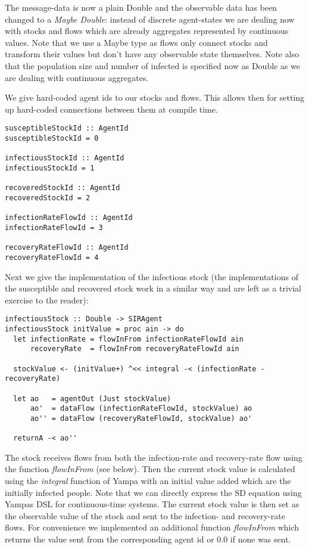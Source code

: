 The message-data is now a plain Double and the observable data has been changed to a \textit{Maybe Double}: instead of discrete agent-states we are dealing now with stocks and flows which are already aggregates represented by continuous values. Note that we use a Maybe type as flows only connect stocks and transform their values but don't have any observable state themselves. Note also that the population size and number of infected is specified now as Double as we are dealing with continuous aggregates.

We give hard-coded agent ids to our stocks and flows. This allows then for setting up hard-coded connections between them at compile time.
\begin{verbatim}
susceptibleStockId :: AgentId
susceptibleStockId = 0

infectiousStockId :: AgentId
infectiousStockId = 1

recoveredStockId :: AgentId
recoveredStockId = 2

infectionRateFlowId :: AgentId
infectionRateFlowId = 3

recoveryRateFlowId :: AgentId
recoveryRateFlowId = 4
\end{verbatim}

Next we give the implementation of the infectious stock (the implementations of the susceptible and recovered stock work in a similar way and are left as a trivial exercise to the reader):

\begin{verbatim}
infectiousStock :: Double -> SIRAgent
infectiousStock initValue = proc ain -> do
  let infectionRate = flowInFrom infectionRateFlowId ain
      recoveryRate  = flowInFrom recoveryRateFlowId ain

  stockValue <- (initValue+) ^<< integral -< (infectionRate - recoveryRate)
  
  let ao   = agentOut (Just stockValue)
      ao'  = dataFlow (infectionRateFlowId, stockValue) ao
      ao'' = dataFlow (recoveryRateFlowId, stockValue) ao'
      
  returnA -< ao''
\end{verbatim}

The stock receives flows from both the infection-rate and recovery-rate flow using the function \textit{flowInFrom} (see below). Then the current stock value is calculated using the \textit{integral} function of Yampa with an initial value added which are the initially infected people. Note that we can directly express the SD equation using Yampas DSL for continuous-time systems. The current stock value is then set as the observable value of the stock and sent to the infection- and recovery-rate flows. For convenience we implemented an additional function \textit{flowInFrom} which returns the value sent from the corresponding agent id or 0.0 if none was sent.

